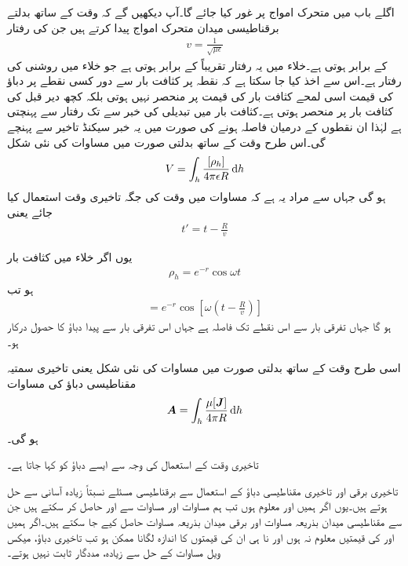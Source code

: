 اگلے باب میں متحرک امواج پر غور کیا جائے گا۔آپ دیکھیں گے کہ وقت کے ساتھ بدلتے برقناطیسی میدان متحرک امواج پیدا کرتے ہیں جن کی رفتار 
\begin{align}
v=\frac{1}{\sqrt{\mu \epsilon}}
\end{align} 
کے برابر ہوتی ہے۔خلاء میں یہ رفتار تقریباً  کے برابر ہوتی ہے جو خلاء میں روشنی کی رفتار ہے۔اس سے اخذ کیا جا سکتا ہے کہ نقطہ  پر کثافت بار سے دور کسی نقطے  پر دباؤ کی قیمت اسی لمحے کثافت بار کی قیمت پر منحصر نہیں ہوتی بلکہ کچھ دیر قبل کی کثافت بار پر منحصر ہوتی ہے۔کثافت بار میں تبدیلی کی خبر  سے  تک رفتار  سے پہنچتی ہے لہٰذا ان نقطوں کے درمیان فاصلہ  ہونے کی صورت میں یہ خبر  سیکنڈ تاخیر سے پہنچے گی۔اس طرح وقت کے ساتھ بدلتی صورت میں مساوات   کی نئی شکل
\begin{align}\label{مساوات_میکس_ویل_تاخیری_غیر_سمتی_دباو}
V=\int_h \frac{[\rho_h]}{4\pi \epsilon R} \dif h
\end{align}
ہو گی جہاں  سے مراد یہ ہے کہ مساوات میں وقت  کی جگہ تاخیری وقت  استعمال کیا جائے یعنی
\begin{align*}
t'=t-\frac{R}{v}
\end{align*}

یوں اگر خلاء میں کثافت بار
\begin{align*}
\rho_h=e^{-r} \cos \omega t
\end{align*}
ہو تب
\begin{align*}
[\rho_h]=e^{-r} \cos \left[\omega \left(t-\frac{R}{v} \right) \right]
\end{align*}
ہو گا جہاں  تفرقی بار سے اس نقطے تک فاصلہ ہے جہاں اس تفرقی بار سے پیدا دباؤ کا حصول درکار ہو۔

اسی طرح وقت کے ساتھ بدلتی صورت میں مساوات  کی نئی شکل یعنی تاخیری سمتیہ مقناطیسی دباؤ کی مساوات
\begin{align}\label{مساوات_میکس_ویل_تاخیری_سمتی_دباو}
\kvec{A}=\int_h \frac{\mu [\kvec{J}]}{4\pi R} \dif h
\end{align}
ہو گی۔

تاخیری وقت کے استعمال کی وجہ سے  ایسے دباؤ کو  کہا جاتا ہے۔

تاخیری برقی اور تاخیری مقناطیسی دباؤ کے استعمال سے برقناطیسی مسئلے نسبتاً زیادہ آسانی سے حل ہوتے ہیں۔یوں اگر ہمیں  اور  معلوم ہوں تب ہم مساوات  اور مساوات  سے  اور  حاصل کر سکتے ہیں جن سے مقناطیسی میدان بذریعہ مساوات  اور برقی میدان بذریعہ مساوات  حاصل کیے جا سکتے ہیں۔اگر ہمیں  اور  کی قیمتیں معلوم نہ ہوں اور نا ہی ان کی قیمتوں کا اندازہ لگانا ممکن ہو تب تاخیری دباؤ، میکس ویل مساوات کے حل سے زیادہ، مددگار ثابت نہیں ہوتے۔ 

